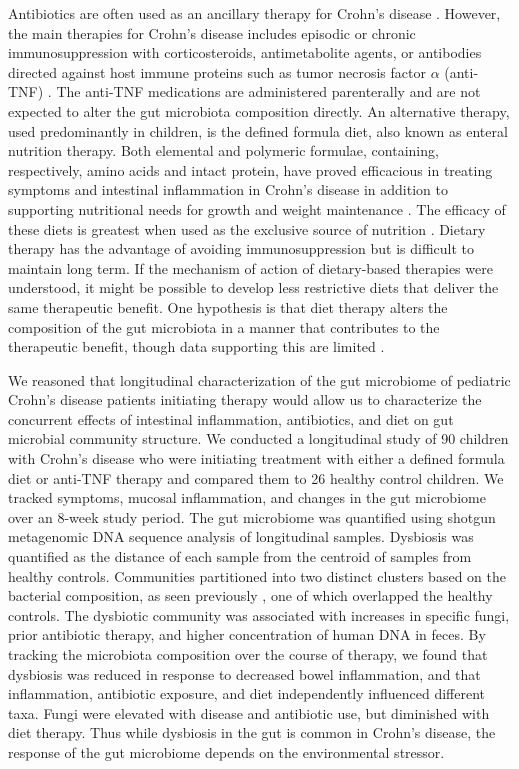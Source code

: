 Antibiotics are often used as an ancillary therapy for Crohn's disease \citep{Khan:2011vo}. However, the main therapies for Crohn's disease includes episodic or chronic immunosuppression with corticosteroids, antimetabolite agents, or antibodies directed against host immune proteins such as tumor necrosis factor $\alpha$ (anti-TNF) \citep{Borrelli:2006tk, Grover:2013dj, Rutgeerts:2012ul}. The anti-TNF medications are administered parenterally and are not expected to alter the gut microbiota composition directly. An alternative therapy, used predominantly in children, is the defined formula diet, also known as enteral nutrition therapy. Both elemental and polymeric formulae, containing, respectively, amino acids and intact protein, have proved efficacious in treating symptoms and intestinal inflammation in Crohn's disease in addition to supporting nutritional needs for growth and weight maintenance \citep{Borrelli:2006tk,Grover:2013dj}. The efficacy of these diets is greatest when used as the exclusive source of nutrition \citep{Grover:2013dj,lee2015comparative}. Dietary therapy has the advantage of avoiding immunosuppression but is difficult to maintain long term. If the mechanism of action of dietary-based therapies were understood, it might be possible to develop less restrictive diets that deliver the same therapeutic benefit. One hypothesis is that diet therapy alters the composition of the gut microbiota in a manner that contributes to the therapeutic benefit, though data supporting this are limited \citep{Gerasimidis:2014gi,Kaakoush:2015hh}.


We reasoned that longitudinal characterization of the gut microbiome of pediatric Crohn's disease patients initiating therapy would allow us to characterize the concurrent effects of intestinal inflammation, antibiotics, and diet on gut microbial community structure. We conducted a longitudinal study of 90 children with Crohn's disease who were initiating treatment with either a defined formula diet or anti-TNF therapy and compared them to 26 healthy control children. We tracked symptoms, mucosal inflammation, and changes in the gut microbiome over an 8-week study period. The gut microbiome was quantified using shotgun metagenomic DNA sequence analysis of longitudinal samples. Dysbiosis was quantified as the distance of each sample from the centroid of samples from healthy controls. Communities partitioned into two distinct clusters based on the bacterial composition, as seen previously \citep{Frank:2007hn, gevers2014treatment}, one of which overlapped the healthy controls. The dysbiotic community was associated with increases in specific fungi, prior antibiotic therapy, and higher concentration of human DNA in feces. By tracking the microbiota composition over the course of therapy, we found that dysbiosis was reduced in response to decreased bowel inflammation, and that inflammation, antibiotic exposure, and diet independently influenced different taxa. Fungi were elevated with disease and antibiotic use, but diminished with diet therapy. Thus while dysbiosis in the gut is common in Crohn's disease, the response of the gut microbiome depends on the environmental stressor.


